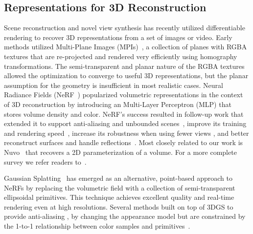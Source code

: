 \subsection{Representations for 3D Reconstruction}
\label{sec:reps}
Scene reconstruction and novel view synthesis has recently utilized differentiable rendering to recover 3D representations from a set of images or video. Early methods utilized Multi-Plane Images (MPIs)~\cite{mildenhall2019local,zhou2018stereo}, a collection of planes with RGBA textures that are re-projected and rendered very efficiently using homography transformations. The semi-transparent and planar nature of the RGBA textures allowed the optimization to converge to useful 3D representations, but the planar assumption for the geometry is insufficient in most realistic cases. Neural Radiance Fields (NeRF~\cite{nerf}) popularized volumetric representations in the context of 3D reconstruction by introducing an Multi-Layer Perceptron (MLP) that stores volume density and color. NeRF's success resulted in follow-up work that extended it to support anti-aliasing and unbounded scenes~\cite{mipnerf, mipnerf360, zhang2020nerf++}, improve its training and rendering speed~\cite{kilonerf, dvxgo, instant-ngp, tensorf, plenoxels, zipnerf, adaptiveshells, sharma2024volumetric}, increase its robustness when using fewer views \cite{pixelnerf, regnerf}, and better reconstruct surfaces and handle reflections~\cite{refnerf, neuralangelo, bakedsdf}. Most closely related to our work is Nuvo~\cite{srinivasan2024nuvo} that recovers a 2D parameterization of a volume. For a more complete survey we refer readers to~\cite{tewari2022advances}.

Gaussian Splatting~\cite{3dgs} has emerged as an alternative, point-based approach to NeRFs by replacing the volumetric field with a collection of semi-transparent ellipsoidal primitives. This technique achieves excellent quality and real-time rendering even at high resolutions.
Several methods built on top of 3DGS to provide anti-aliasing \cite{mipsplatting},
by changing the appearance model but are constrained by the 1-to-1 relationship between color samples and primitives~\cite{specgaussian,malarz2025gaussian}. 

